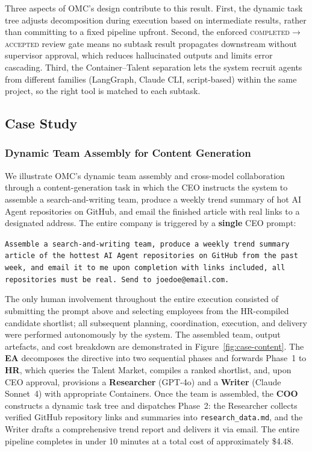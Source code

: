 \documentclass[11pt,a4paper]{article}
\begin{document}
Three aspects of OMC's design contribute to this result.  First, the dynamic task tree adjusts decomposition during execution based on intermediate results, rather than committing to a fixed pipeline upfront.  Second, the enforced \textsc{completed}$\to$\textsc{accepted} review gate means no subtask result propagates downstream without supervisor approval, which reduces hallucinated outputs and limits error cascading.  Third, the Container--Talent separation lets the system recruit agents from different families (LangGraph, Claude CLI, script-based) within the same project, so the right tool is matched to each subtask.

\subsection{Case Study}

\subsubsection{Dynamic Team Assembly for Content Generation}
\label{sec:case-content}

We illustrate OMC's dynamic team assembly and cross-model collaboration through a
content-generation task in which the CEO instructs the system to assemble a
search-and-writing team, produce a weekly trend summary of hot AI Agent repositories
on GitHub, and email the finished article with real links to a designated address.
The entire company is triggered by a \textbf{single} CEO prompt:

\begin{mdframed}[
nobreak=true,
  linewidth=0.8pt,
  linecolor=black!40,
  backgroundcolor=black!2,
  innertopmargin=10pt,
  innerbottommargin=10pt,
  innerleftmargin=14pt,
  innerrightmargin=14pt,
  roundcorner=4pt
]
\sloppy
\noindent\texttt{Assemble a search-and-writing team, produce a weekly trend summary article of the hottest AI Agent repositories on GitHub from the past week, and email it to me upon completion with links included, all repositories must be real. Send to joedoe@email.com.}
\end{mdframed}



\noindent The only human involvement throughout the entire execution consisted of submitting the prompt above and selecting employees from the HR-compiled candidate shortlist; all subsequent planning, coordination,
execution, and delivery were performed autonomously by the system. The assembled team, output artefacts, and cost breakdown are demonstrated in Figure~\ref{fig:case-content}. The \textbf{EA} decomposes the directive into two sequential phases and forwards
Phase~1 to \textbf{HR}, which queries the Talent Market, compiles a ranked shortlist,
and, upon CEO approval, provisions a \textbf{Researcher} (GPT-4o) and a
\textbf{Writer} (Claude Sonnet~4) with appropriate Containers.
Once the team is assembled, the \textbf{COO} constructs a dynamic task tree and
dispatches Phase~2: the Researcher collects verified GitHub repository links and
summaries into \texttt{research\_data.md}, and the Writer drafts a comprehensive
trend report and delivers it via email. The entire pipeline completes in under
10 minutes at a total cost of approximately \$4.48.
\end{document}
